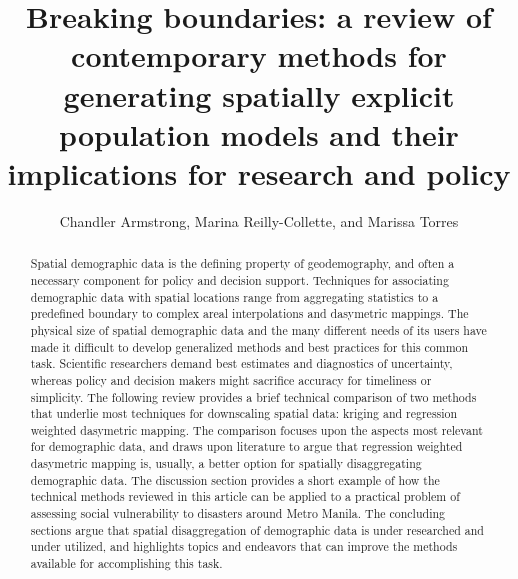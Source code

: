 \documentclass[draft]{article}
\title{Breaking boundaries: a review of contemporary methods for generating spatially explicit population models and their implications for research and policy}
\author{Chandler Armstrong, Marina Reilly-Collette, and Marissa Torres}
\date{} %
\begin{document}
\maketitle
\newpage


\begin{abstract} %
  Spatial demographic data is the defining property of geodemography, and often a necessary component for policy and decision support.  Techniques for associating demographic data with spatial locations range from aggregating statistics to a predefined boundary%
  to complex areal interpolations and dasymetric mappings.  The physical size of spatial demographic data and the many different needs of its users have made it difficult to develop generalized methods and best practices for this common task.  Scientific researchers demand best estimates and diagnostics of uncertainty, whereas policy and decision makers might sacrifice accuracy for timeliness or simplicity.  %
  The following review provides a brief technical comparison of two methods that underlie most techniques for downscaling spatial data: kriging and regression weighted dasymetric mapping.  The comparison focuses upon the aspects most relevant for demographic data, and draws upon literature to argue that regression weighted dasymetric mapping is, usually, a better option for spatially disaggregating demographic data.
  The discussion section
  provides a short example of how the technical methods reviewed in this article can be applied to a practical problem of assessing social vulnerability to disasters around Metro Manila.
  The concluding sections argue that spatial disaggregation of demographic data is under researched and under utilized, and highlights topics and endeavors that can improve the methods available for accomplishing this task.
\end{abstract}
\end{document}
